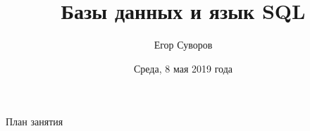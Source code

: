 \documentclass[utf8,xcolor=table]{beamer}
\title{Базы данных и язык SQL}
\author{Егор Суворов}
\institute[СПбГУ]{Курс <<Парадигмы и языки программирования>>, группа 18.Б09-пу}
\date[08.05.2019]{Среда, 8 мая 2019 года}
\begin{document}
\begin{frame}
\titlepage
\end{frame}

\begin{frame}{План занятия}
	\tableofcontents
\end{frame}








\end{document}
